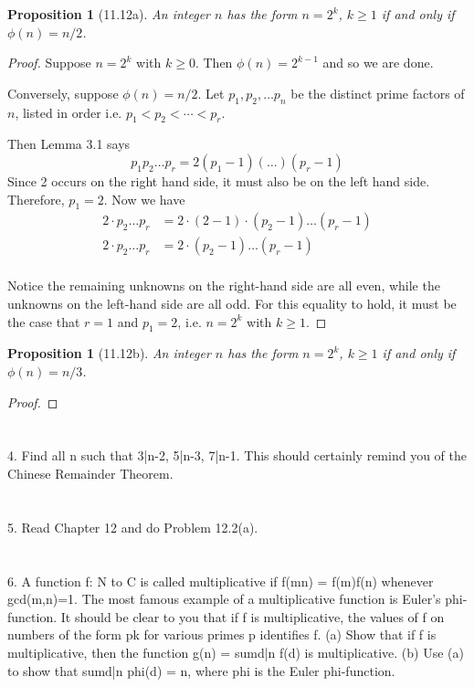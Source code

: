 \documentclass[letterpaper, 12pt, oneside]{memoir}
\theoremstyle{mystyle}
\newtheorem{prop}[thm]{Proposition}
\begin{document}
\begin{prop}[11.12a]
    An integer $n$ has the form $n=2^k$, $k \geq 1$ if and only if 
    $\phi(n) = n/2$.
\end{prop}
\begin{proof}
    Suppose $n=2^k$ with $k \geq 0$. Then $\phi(n) = 2^{k-1}$ and so we are
    done.
    
    Conversely, suppose $\phi(n)=n/2$. Let $p_1, p_2, \dots p_n$ be the distinct
    prime factors of $n$, listed in order i.e. $p_1 < p_2 < \cdots < p_r$.
    
    Then Lemma 3.1 says
    \[ p_1 p_2 \ldots p_r = 2 (p_1 - 1)(\ldots)(p_r - 1) \]
    Since 2 occurs on the right hand side, it must also be on the left hand
    side. Therefore, $p_1 = 2$. Now we have
    \begin{align*}
    2 \cdot p_2 \dots p_r &= 2 \cdot (2 - 1) \cdot (p_2 - 1) \dots (p_r - 1) \\
    2 \cdot p_2 \dots p_r &= 2 \cdot (p_2 - 1) \dots (p_r - 1) \\
    \end{align*}
    
    Notice the remaining unknowns on the right-hand side are all even, while
    the unknowns on the left-hand side are all odd. For this equality to hold,
    it must be the case that $r=1$ and $p_1 = 2$, i.e. $n=2^k$ with $k \geq 1$.
\end{proof}


\begin{prop}[11.12b]
    An integer $n$ has the form $n=2^k$, $k \geq 1$ if and only if 
    $\phi(n) = n/3$.
\end{prop}
\begin{proof}

\end{proof}

\section{} 
4. Find all n such that  3|n-2, 5|n-3, 7|n-1. This should certainly remind you of the Chinese Remainder Theorem. 
\section{} 
5. Read Chapter 12 and do Problem 12.2(a). 
\section{} 
6. A function f: N to C is called multiplicative if f(mn) = f(m)f(n) whenever gcd(m,n)=1. The most famous example of a multiplicative function is Euler's phi-function. It should be clear to you that if f is multiplicative, the values of f on numbers of the form pk for various primes p identifies f. 
(a) Show that if f is multiplicative, then the function g(n) = sumd|n f(d) is multiplicative. 
(b) Use (a) to show that sumd|n phi(d) = n, where phi is the Euler phi-function. 
\end{document}
